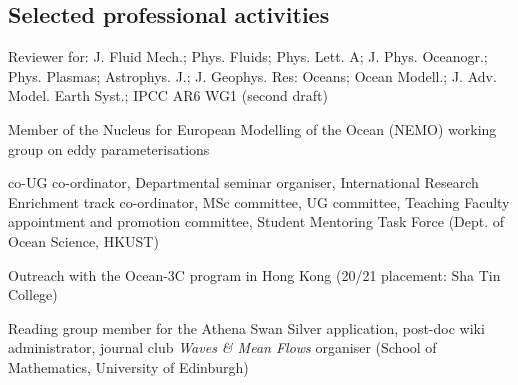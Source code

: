 \documentclass[letterpaper]{article}
\renewenvironment{itemize}{
  \begin{list}{}{
    \setlength{\leftmargin}{1.5em}
  }
}{
  \end{list}
}
\begin{document}
\subsection*{Selected professional activities}
\begin{itemize}

\item[--] Reviewer for: J. Fluid Mech.; Phys. Fluids; Phys. Lett. A; J. Phys.
Oceanogr.; Phys. Plasmas; Astrophys. J.; J. Geophys. Res: Oceans; Ocean Modell.;
J. Adv. Model. Earth Syst.; IPCC AR6 WG1 (second draft)

\item[--] Member of the Nucleus for European Modelling of the Ocean (NEMO)
working group on eddy parameterisations

\item[--] co-UG co-ordinator, Departmental seminar organiser, International
Research Enrichment track co-ordinator, MSc committee, UG committee, Teaching
Faculty appointment and promotion committee, Student Mentoring Task Force (Dept.
of Ocean Science, HKUST)

\item[--] Outreach with the Ocean-3C program in Hong Kong (20/21 placement: Sha
Tin College)

\item[--] Reading group member for the Athena Swan Silver application, post-doc
wiki administrator, journal club \textit{Waves \& Mean Flows} organiser (School
of Mathematics, University of Edinburgh)

\end{itemize}


\end{document}
